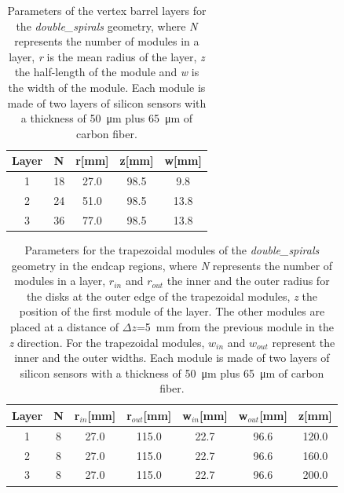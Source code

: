 \begin{table}[H]
  \caption{Parameters of the vertex barrel layers for the {\it
      double\_spirals} geometry, where \textit{N} represents the
    number of modules in a layer, \textit{r} is the mean radius of the
    layer, \textit{z} the half-length of the module and \textit{w} is
    the width of the module. Each module is made of two layers of
    silicon sensors with a thickness of \SI{50}{\micro\meter} plus \SI{65}{\micro\meter} of carbon fiber.}
  \label{tab:params_DL}
  \begin{center}
    \begin{tabular}{ c c c c c }
      \hline
      Layer & N & r[mm] & z[mm] & w[mm]\\ \hline \hline
      1 & 18 & 27.0 & 98.5 & 9.8 \\ \hline
      2 & 24 & 51.0 & 98.5 & 13.8 \\ \hline
      3 & 36 & 77.0 & 98.5 & 13.8 \\ \hline
    \end{tabular}
  \end{center}  
\end{table}

\begin{table}[H]
  \caption{Parameters for the trapezoidal modules of the {\it
      double\_spirals} geometry in the endcap regions, where
    \textit{N} represents the number of modules in a layer, $r_{in}$
    and $r_{out}$ the inner and the outer radius for the disks at the
    outer edge of the trapezoidal modules, \textit{z} the position of
    the first module of the layer. The other modules are placed at a
    distance of $\Delta z$=5~mm from the previous module in the
    \textit{z} direction. For the trapezoidal modules, $w_{in}$ and
    $w_{out}$ represent the inner and the outer widths. Each module is
    made of two layers of silicon sensors with a thickness of
    \SI{50}{\micro\meter} plus \SI{65}{\micro\meter} of carbon fiber.}
  \begin{center}
    \begin{tabular}{ c c c c c c c }
      \hline
      Layer & N & r$_{in}$[mm] & r$_{out}$[mm] & w$_{in}$[mm] & w$_{out}$[mm] & z[mm] \\ \hline \hline
      1 & 8 & 27.0 & 115.0 & 22.7 & 96.6 & 120.0 \\ \hline
      2 & 8 & 27.0 & 115.0 & 22.7 & 96.6 & 160.0 \\ \hline
      3 & 8 & 27.0 & 115.0 & 22.7 & 96.6 & 200.0 \\ \hline
    \end{tabular}
  \end{center}
  \label{tab:params_double_endcap}
\end{table}

